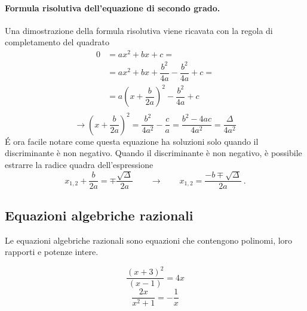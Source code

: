 \paragraph{Formula risolutiva dell'equazione di secondo grado.}
Una dimostrazione della formula risolutiva viene ricavata con la regola di completamento del quadrato
\begin{equation}
    \begin{aligned}
        0 & = a x^2 + b x + c = \\
          & = a x^2 + b x + \dfrac{b^2}{4a} - \dfrac{b^2}{4a} + c = \\
          & = a \left(x + \dfrac{b}{2a} \right)^2 - \dfrac{b^2}{4a} + c \\
    \end{aligned}
\end{equation}
\begin{equation}
    \rightarrow \left( x + \dfrac{b}{2a} \right)^2 = \dfrac{b^2}{4 a^2} - \dfrac{c}{a} = \dfrac{b^2 - 4 a c}{4a^2} = \dfrac{\Delta}{4a^2}
\end{equation}
\'E ora facile notare come questa equazione ha soluzioni solo quando il discriminante è non negativo. Quando il discriminante è non negativo, è possibile estrarre la radice quadra dell'espressione
\begin{equation}
    x_{1,2} + \dfrac{b}{2a} = \mp \dfrac{\sqrt{\Delta}}{2a} \qquad \rightarrow \qquad 
    x_{1,2} = \dfrac{-b  \mp \sqrt{\Delta}}{2a} \ . 
\end{equation}

\subsection{Equazioni algebriche razionali}
\begin{definition} Le equazioni algebriche razionali sono equazioni che contengono polinomi, loro rapporti e potenze intere.
\end{definition}
\begin{example}
\begin{equation}
    \dfrac{(x + 3)^2}{(x-1)} = 4 x 
\end{equation}
\begin{equation}
    \dfrac{2x}{x^2+1} = -\dfrac{1}{x}
\end{equation}
\end{example}

